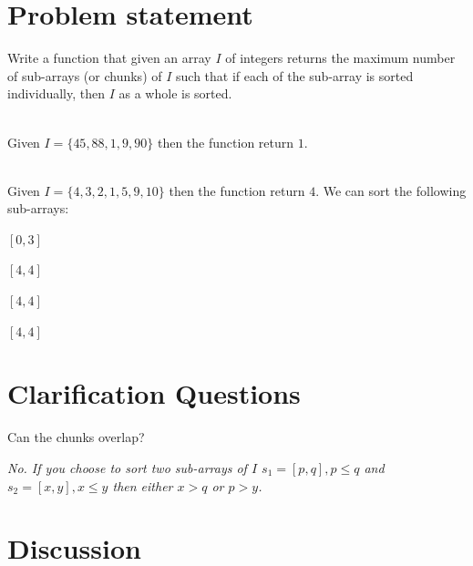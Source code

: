 \section{Problem statement}
\begin{exercise}
\label{example:max_num_chunks_sorted:exercice1}
Write a function that given an array $I$ of integers returns the maximum number of sub-arrays (or chunks) of $I$ 
such that if each of the sub-array is sorted individually, then $I$ as a whole is sorted.

	\begin{example}
		\label{example:max_num_chunks_sorted:example1}
		\hfill \\
		Given $I=\{45,88,1,9,90\}$ then the function return $1$.
		
	\end{example}

	\begin{example}
		\label{example:max_num_chunks_sorted:example2}
		\hfill \\
		Given $I=\{4,3,2,1,5,9,10\}$ then the function return $4$. We can sort the following sub-arrays:
		\begin{itemize*}
			\item $[0,3]$
			\item $[4,4]$
			\item $[4,4]$
			\item $[4,4]$
		\end{itemize*}
	\end{example}
\end{exercise}

\section{Clarification Questions}

\begin{QandA}
	\item Can the chunks overlap? 
	\begin{answered}
		\textit{No. If you choose to sort two sub-arrays of $I$ $s_1=[p,q], p\leq q$ and $s_2=[x,y], x\leq y$ then either $x > q$ or $p>y$.}
	\end{answered}
	
\end{QandA}

\section{Discussion}
\label{max_num_chunks_sorted:sec:discussion}

